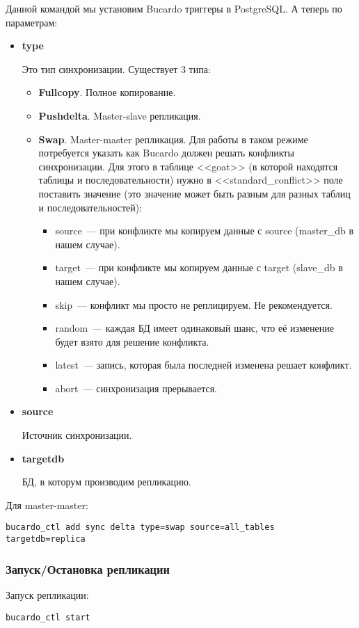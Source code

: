 Данной командой мы установим Bucardo триггеры в PostgreSQL. А теперь по параметрам:
\begin{itemize}
\item \textbf{type}

Это тип синхронизации. Существует 3 типа:
\begin{itemize}
\item \textbf{Fullcopy}. Полное копирование.
\item \textbf{Pushdelta}. Master-slave репликация.
\item \textbf{Swap}. Master-master репликация.
Для работы в таком режиме потребуется указать как Bucardo должен решать конфликты синхронизации.
Для этого в таблице <<goat>> (в которой находятся таблицы и последовательности) нужно в <<standard\_conflict>>
поле поставить значение (это значение может быть разным для разных таблиц и последовательностей):
\begin{itemize}
\item source~--- при конфликте мы копируем данные с source (master\_db в нашем случае).
\item target~--- при конфликте мы копируем данные с target (slave\_db в нашем случае).
\item skip~--- конфликт мы просто не реплицируем. Не рекомендуется.
\item random~--- каждая БД имеет одинаковый шанс, что её изменение будет взято для решение конфликта.
\item latest~--- запись, которая была последней изменена решает конфликт.
\item abort~--- синхронизация прерывается.
\end{itemize}
\end{itemize}

\item \textbf{source}

Источник синхронизации.

\item \textbf{targetdb}

БД, в которум производим репликацию.
\end{itemize}

Для master-master:
\begin{lstlisting}[label=lst:bucardo10,caption=Настройка синхронизации]
bucardo_ctl add sync delta type=swap source=all_tables targetdb=replica
\end{lstlisting}

\subsubsection{Запуск/Остановка репликации}
Запуск репликации:
\begin{lstlisting}[label=lst:bucardo11,caption=Запуск репликации]
bucardo_ctl start
\end{lstlisting}

